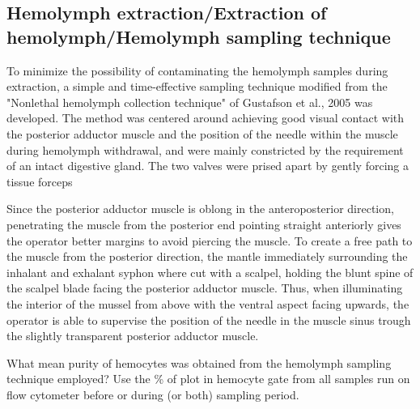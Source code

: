 \subsection{Hemolymph extraction/Extraction of hemolymph/Hemolymph sampling technique}
To minimize the possibility of contaminating the hemolymph samples during extraction, a simple and time-effective sampling technique modified from the "Nonlethal hemolymph collection technique" of Gustafson et al., 2005 was developed. The method was centered around achieving good visual contact with the posterior adductor muscle and the position of the needle within the muscle during hemolymph withdrawal, and were mainly constricted by the requirement of an intact digestive gland. The two valves were prised apart by gently forcing a tissue forceps 

Since the posterior adductor muscle is oblong in the anteroposterior direction, penetrating the muscle from the posterior end pointing straight anteriorly gives the operator better margins to avoid piercing the muscle. To create a free path to the muscle from the posterior direction, the mantle immediately surrounding the inhalant and exhalant syphon where cut with a scalpel, holding the blunt spine of the scalpel blade facing the posterior adductor muscle. Thus, when illuminating the interior of the mussel from above with the ventral aspect facing upwards, the operator is able to supervise the position of the needle in the muscle sinus trough the slightly transparent posterior adductor muscle.



What mean purity of hemocytes was obtained from the hemolymph sampling technique employed? Use the \% of plot in hemocyte gate from all samples run on flow cytometer before or during (or both) sampling period.
